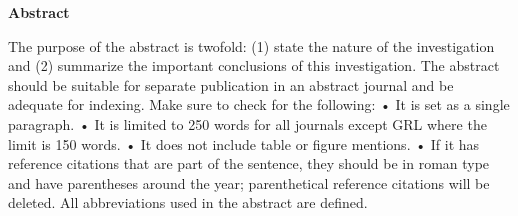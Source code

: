 \textbf{Abstract}

The purpose of the abstract is twofold: (1) state the nature of the investigation and (2) summarize the important conclusions of this investigation. The abstract should be suitable for separate publication in an abstract journal and be adequate for indexing. Make sure to check for the following:
•	It is set as a single paragraph.
•	It is limited to 250 words for all journals except GRL where the limit is 150 words.
•	It does not include table or figure mentions.
•	If it has reference citations that are part of the sentence, they should be in roman type and have parentheses around the year; parenthetical reference citations will be deleted.
All abbreviations used in the abstract are defined.
  